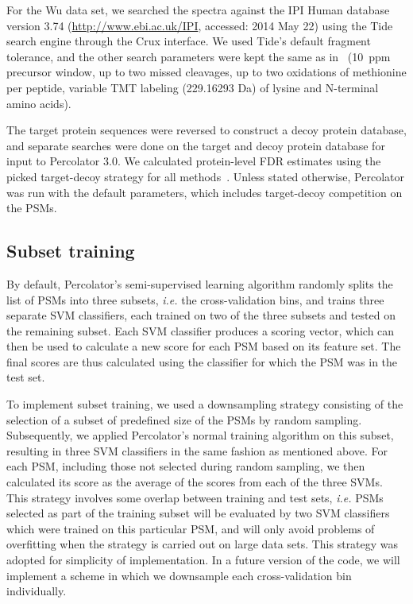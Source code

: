 \documentclass{article}
\begin{document}
For the Wu data set, we searched the spectra against the IPI Human
database version 3.74 (\url{http://www.ebi.ac.uk/IPI}, accessed: 2014
May 22) using the Tide search engine through the Crux interface. We
used Tide's default fragment tolerance, and the other search
parameters were kept the same as in~\cite{wu2013} (10~ppm precursor
window, up to two missed cleavages, up to two oxidations of methionine
per peptide, variable TMT labeling (229.16293 Da) of lysine and
N-terminal amino acids).

The target protein sequences were reversed to construct a decoy 
protein database, and separate searches were done on the target and 
decoy protein database for input to Percolator 3.0. We calculated 
protein-level FDR estimates using the picked target-decoy strategy for 
all methods~\cite{savitski2015scalable}. Unless stated otherwise, 
Percolator was run with the default parameters, which includes 
target-decoy competition on the PSMs.

\subsection*{Subset training}

By default, Percolator's semi-supervised learning algorithm randomly 
splits the list of PSMs into three subsets, {\em i.e.} the 
cross-validation bins, and trains three separate SVM classifiers, each 
trained on two of the three subsets and tested on the remaining 
subset. Each SVM classifier produces a scoring vector, which can then 
be used to calculate a new score for each PSM based on its feature 
set. The final scores are thus calculated using the classifier for 
which the PSM was in the test set.

To implement subset training, we used a downsampling strategy 
consisting of the selection of a subset of predefined size of the PSMs 
by random sampling. Subsequently, we applied Percolator's normal 
training algorithm on this subset, resulting in three SVM classifiers 
in the same fashion as mentioned above. For each PSM, including those 
not selected during random sampling, we then calculated its score as 
the average of the scores from each of the three SVMs. This strategy 
involves some overlap between training and test sets, {\em i.e.} PSMs 
selected as part of the training subset will be evaluated by two SVM 
classifiers which were trained on this particular PSM, and will only 
avoid problems of overfitting when the strategy is carried out on 
large data sets. This strategy was adopted for simplicity of 
implementation. In a future version of the code, we will implement a 
scheme in which we downsample each cross-validation bin individually.
\end{document}
